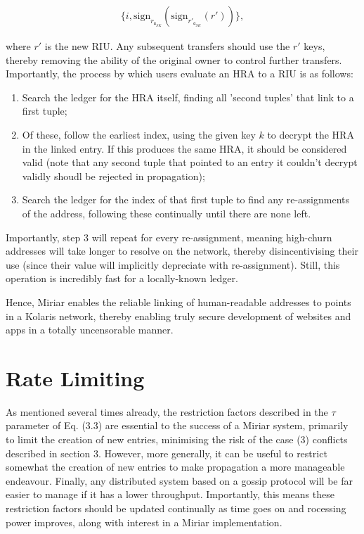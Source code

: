 \documentclass{extreport}
\begin{document}
\begin{align*}
\{ i, \mathrm{sign}_{r_{\mathfrak{a}_{SK}}}(\mathrm{sign}_{r'_{\mathfrak{a}_{SK}}}(r')) \}, \tag{5.3}
\end{align*}

where \(r'\) is the new RIU. Any subsequent transfers should use the \(r'\) keys, thereby removing the ability of the original owner to control further transfers. Importantly, the process by which users evaluate an HRA to a RIU is as follows:

\begin{enumerate}
\item Search the ledger for the HRA itself, finding all 'second tuples' that link to a first tuple;
\item Of these, follow the earliest index, using the given key \(k\) to decrypt the HRA in the linked entry. If this produces the same HRA, it should be considered valid (note that any second tuple that pointed to an entry it couldn't decrypt validly shoudl be rejected in propagation);
\item Search the ledger for the index of that first tuple to find any re-assignments of the address, following these continually until there are none left.
\end{enumerate}

Importantly, step 3 will repeat for every re-assignment, meaning high-churn addresses will take longer to resolve on the network, thereby disincentivising their use (since their value will implicitly depreciate with re-assignment). Still, this operation is incredibly fast for a locally-known ledger.

Hence, Miriar enables the reliable linking of human-readable addresses to points in a Kolaris network, thereby enabling truly secure development of websites and apps in a totally uncensorable manner.

\chapter{Rate Limiting}
\label{sec:org9f56f8d}

As mentioned several times already, the restriction factors described in the \(\tau\) parameter of Eq. (3.3) are essential to the success of a Miriar system, primarily to limit the creation of new entries, minimising the risk of the case (3) conflicts described in section 3. However, more generally, it can be useful to restrict somewhat the creation of new entries to make propagation a more manageable endeavour. Finally, any distributed system based on a gossip protocol will be far easier to manage if it has a lower throughput. Importantly, this means these restriction factors should be updated continually as time goes on and rocessing power improves, along with interest in a Miriar implementation.
\end{document}
